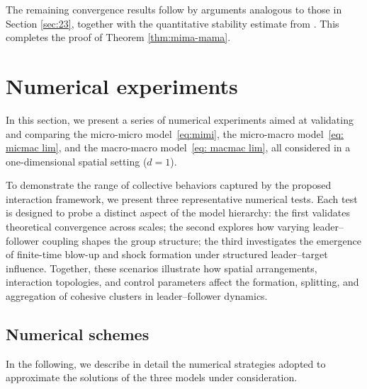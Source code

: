 \documentclass[10pt, reqno]{amsart}
\theoremstyle{definition}
\theoremstyle{remark}
\numberwithin{equation}{section}
\begin{document}
The remaining convergence results follow by arguments analogous to those in Section \ref{sec:23}, together with the quantitative stability estimate from \cite[Corollary 2.3]{CCJ21}.  This completes the proof of Theorem \ref{thm:mima-mama}.



%
%

%
%
%
%
%
%
%
%
%
%



%
%
%
%
%


\section{Numerical experiments}\label{sec_numer}
In this section, we present a series of numerical experiments aimed at validating and comparing the micro-micro model~\eqref{eq:mimi}, the micro-macro model~\eqref{eq: micmac lim}, and the macro-macro model~\eqref{eq: macmac lim}, all considered in a one-dimensional spatial setting ($d = 1$).

To demonstrate the range of collective behaviors captured by the proposed interaction framework, we present three representative numerical tests.  
Each test is designed to probe a distinct aspect of the model hierarchy: the first validates theoretical convergence across scales; the second explores how varying leader–follower coupling shapes the group structure; the third investigates the emergence of finite-time blow-up and shock formation under structured leader–target influence.  
Together, these scenarios illustrate how spatial arrangements, interaction topologies, and control parameters affect the formation, splitting, and aggregation of cohesive clusters in leader–follower dynamics.


\subsection{Numerical schemes}
In the following, we describe in detail the numerical strategies adopted to approximate the solutions of the three models under consideration.
\end{document}
